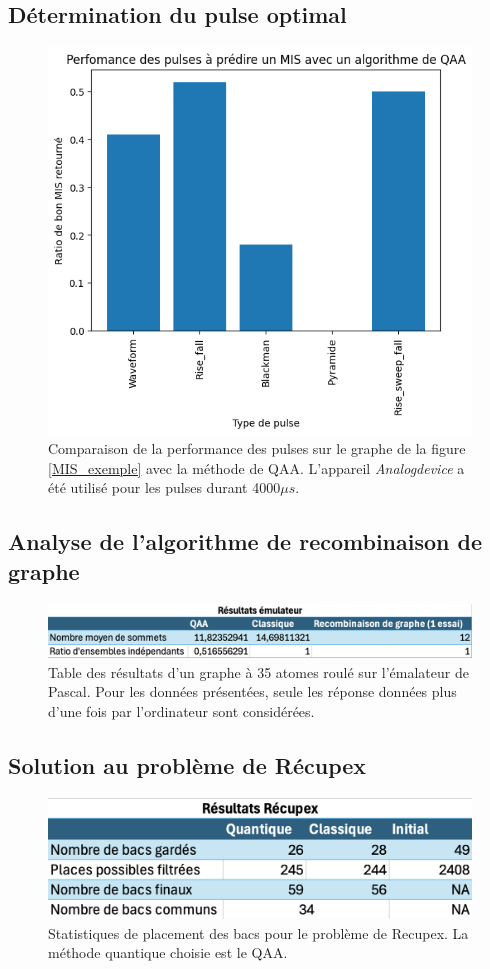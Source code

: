 \documentclass[11pt]{article}
\begin{document}
\subsection{Détermination du pulse optimal}
\begin{figure}[H]
    \centering
    \includegraphics[width=0.49\linewidth]{images/pusle_comp.png}
    \caption{Comparaison de la performance des pulses sur le graphe de la figure \ref{MIS_exemple} avec la méthode de QAA. L'appareil \textit{Analogdevice} a été utilisé pour les pulses durant 4000$\mu s$.}
    \label{pulse_comp}
\end{figure}

\subsection{Analyse de l'algorithme de recombinaison de graphe}
\begin{figure}[H]
    \centering
    \includegraphics[width=0.70\linewidth]{images/table_emul.png}
    \caption{Table des résultats d'un graphe à 35 atomes roulé sur l'émalateur de Pascal. Pour les données présentées, seule les réponse données plus d'une fois par l'ordinateur sont considérées.}
    \label{emul_stats}
\end{figure}

\subsection{Solution au problème de Récupex}
\begin{figure}[H]
    \centering
    \includegraphics[width=0.49\linewidth]{images/recupex_solver.png}
    \caption{Statistiques de placement des bacs pour le problème de Recupex. La méthode quantique choisie est le QAA.}
    \label{recupex_stats}
\end{figure}
\end{document}
